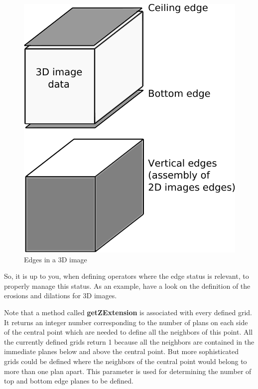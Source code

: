 \documentclass[a4paper,10pt,oneside]{article}
\begin{document}
\begin{figure}
\centering
\includegraphics[scale=0.6]{figures/3D_edges.pdf}
\caption{Edges in a 3D image}
\label{fig:3D_edges}
\end{figure}

So, it is up to you, when defining operators where the edge status is relevant, to properly manage this status. As an example, have a look on the
definition of the erosions and dilations for 3D images.

Note that a method called \textbf{getZExtension} is associated with every defined grid. It returns an integer number corresponding to
the number of plans on each side of the central point which are needed to define all the neighbors of this point. All the currently
defined grids return 1 because all the neighbors are contained in the immediate planes below and above the central point. But more
sophisticated grids could be defined where the neighbors of the central point would belong to more than one plan apart. This parameter is
used for determining the number of top and bottom edge planes to be defined.
 
\end{document}
